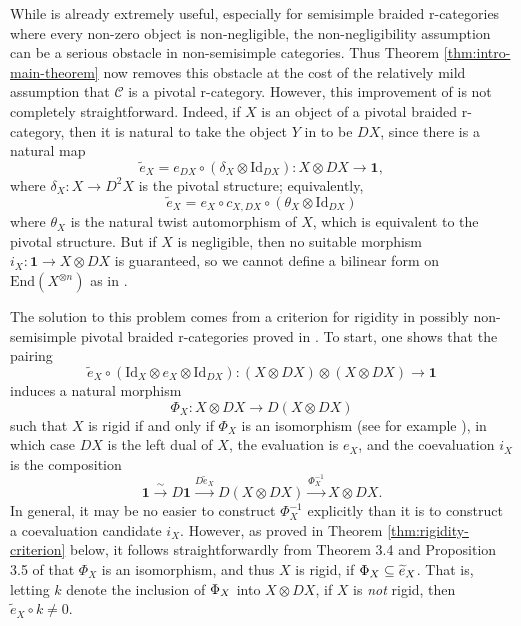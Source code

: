 \documentclass[11pt, reqno]{amsart}
\theoremstyle{definition}\newtheorem{defi}[thm]{Definition}
\theoremstyle{definition}\newtheorem{rem}[thm]{Remark}
\theoremstyle{definition}\newtheorem{exam}[thm]{Example}
\theoremstyle{definition}\newtheorem{assum}[thm]{Assumption}
\newcommand{\cC}{\mathcal{C}}
\newcommand{\til}{\widetilde}
\newcommand{\Id}{\mathrm{Id}}
\newcommand{\vac}{\mathbf{1}}
\let\ker\relax
\DeclareMathOperator{\ker}{Ker}
\begin{document}
While \cite[Theorem 1.1]{EP} is already extremely useful, especially for semisimple braided r-categories where every non-zero object is non-negligible, the non-negligibility assumption can be a serious obstacle in non-semisimple categories. Thus Theorem \ref{thm:intro-main-theorem} now removes this obstacle at the cost of the relatively mild assumption that $\cC$ is a pivotal r-category. However, this improvement of \cite[Theorem 1.1]{EP} is not completely straightforward. Indeed, if $X$ is an object of a pivotal braided r-category, then it is natural to take the object $Y$ in \cite{EP} to be $DX$, since there is a natural map
\begin{equation*}
\til{e}_X = e_{DX}\circ(\delta_X\otimes\Id_{DX}): X\otimes DX\longrightarrow\vac,
\end{equation*}
where $\delta_X: X\rightarrow D^2X$ is the pivotal structure; equivalently,
\begin{equation*}
\til{e}_X= e_X\circ c_{X,DX}\circ(\theta_X\otimes\Id_{DX})
\end{equation*}
where $\theta_X$ is the natural twist automorphism of $X$, which is equivalent to the pivotal structure.
 But if $X$ is negligible, then no suitable morphism $i_X: \vac\rightarrow X\otimes DX$ is guaranteed, so we cannot define a bilinear form on $\mathrm{End}(X^{\otimes n})$ as in \cite{EP}.

The solution to this problem comes from a criterion for rigidity in possibly non-semisimple pivotal braided r-categories proved in \cite{McR}. To start, one shows that the pairing
\begin{equation*}
\til{e}_X\circ(\Id_X\otimes e_X\otimes \Id_{DX}): (X\otimes DX)\otimes (X\otimes DX)\longrightarrow\vac
\end{equation*}
induces a natural morphism
\begin{equation*}
\Phi_X: X\otimes DX\longrightarrow D(X\otimes DX)
\end{equation*}
such that $X$ is rigid if and only if $\Phi_X$ is an isomorphism (see for example \cite[Corollary 3.6]{BD}), in which case $DX$ is the left dual of $X$, the evaluation is $e_X$, and the coevaluation $i_X$ is the composition
\begin{equation*}
\vac\xrightarrow{\sim} D\vac\xrightarrow{D\til{e}_X} D(X\otimes DX)\xrightarrow{\Phi_X^{-1}} X\otimes DX.
\end{equation*}
In general, it may be no easier to construct $\Phi_X^{-1}$ explicitly than it is to construct a coevaluation candidate $i_X$. However, as proved in Theorem \ref{thm:rigidity-criterion} below, it follows straightforwardly from Theorem 3.4 and Proposition 3.5 of \cite{McR} that $\Phi_X$ is an isomorphism, and thus $X$ is rigid, if $\ker\Phi_X\subseteq\ker\til{e}_X$. That is, letting $k$ denote the inclusion of $\ker\Phi_X$ into $X\otimes DX$, if $X$ is \textit{not} rigid, then $\til{e}_X\circ k\neq 0$.
\end{document}
